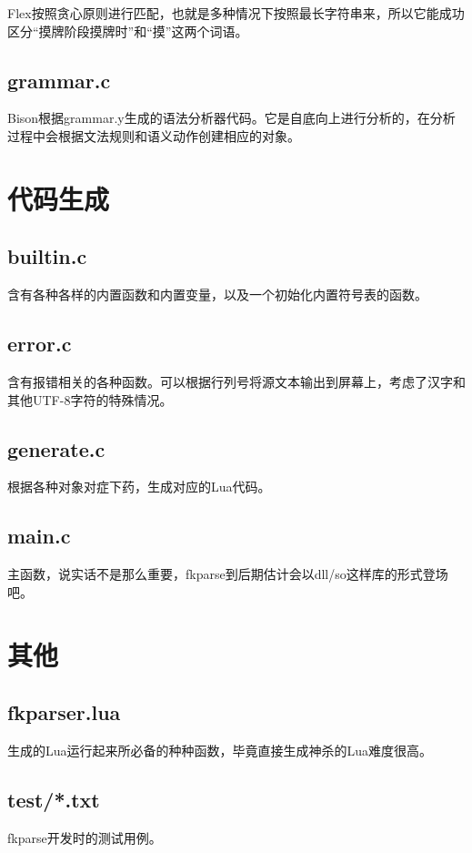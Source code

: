 Flex按照贪心原则进行匹配，也就是多种情况下按照最长字符串来，所以它能成功区分“摸牌阶段摸牌时”和“摸”这两个词语。

\subsection{grammar.c}

Bison根据grammar.y生成的语法分析器代码。它是自底向上进行分析的，在分析过程中会根据文法规则和语义动作创建相应的对象。

\section{代码生成}

\subsection{builtin.c}

含有各种各样的内置函数和内置变量，以及一个初始化内置符号表的函数。

\subsection{error.c}

含有报错相关的各种函数。可以根据行列号将源文本输出到屏幕上，考虑了汉字和其他UTF-8字符的特殊情况。

\subsection{generate.c}

根据各种对象对症下药，生成对应的Lua代码。

\subsection{main.c}

主函数，说实话不是那么重要，fkparse到后期估计会以dll/so这样库的形式登场吧。

\section{其他}

\subsection{fkparser.lua}

生成的Lua运行起来所必备的种种函数，毕竟直接生成神杀的Lua难度很高。

\subsection{test/*.txt}

fkparse开发时的测试用例。
